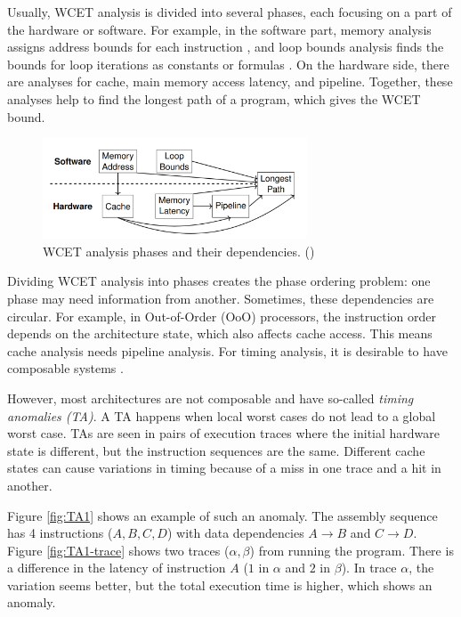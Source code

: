 Usually, WCET analysis is divided into several phases, each focusing on a part of the hardware or software. For example, in the software part, memory analysis assigns address bounds for each instruction \cite{Harrison_Ranges_1977}, and loop bounds analysis finds the bounds for loop iterations as constants or formulas \cite{Healy_bounding_1998}. On the hardware side, there are analyses for cache, main memory access latency, and pipeline. Together, these analyses help to find the longest path of a program, which gives the WCET bound.

\begin{figure}
    \centering
    \includegraphics[width=0.7\textwidth]{figures/wcet-deps.png}
    \caption{WCET analysis phases and their dependencies. ()}
    \label{fig:wcet-deps}
\end{figure}

Dividing WCET analysis into phases creates the phase ordering problem: one phase may need information from another. Sometimes, these dependencies are circular. For example, in Out-of-Order (OoO) processors, the instruction order depends on the architecture state, which also affects cache access. This means cache analysis needs pipeline analysis. For timing analysis, it is desirable to have composable systems \cite{Puschner_computing_1997}.

However, most architectures are not composable and have so-called \textit{timing anomalies (TA)}. A TA happens when local worst cases do not lead to a global worst case. TAs are seen in pairs of execution traces where the initial hardware state is different, but the instruction sequences are the same. Different cache states can cause variations in timing because of a miss in one trace and a hit in another.

\begin{example}
Figure \ref{fig:TA1} shows an example of such an anomaly. The assembly sequence has 4 instructions ($A,B,C,D$) with data dependencies $A \rightarrow B$ and $C \rightarrow D$. Figure \ref{fig:TA1-trace} shows two traces ($\alpha, \beta$) from running the program. There is a difference in the latency of instruction $A$ ($1$ in $\alpha$ and $2$ in $\beta$). In trace $\alpha$, the variation seems better, but the total execution time is higher, which shows an anomaly.
\label{ex:simple-ta}
\end{example}

